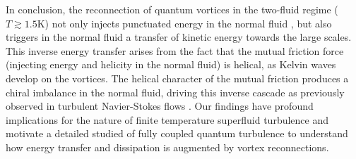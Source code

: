 \documentclass[%
 reprint,
 amsmath,amssymb,
 aps,
 prl,
]{revtex4-2}
\begin{document}
In conclusion, the reconnection of quantum vortices in the two-fluid regime
($T\gtrsim 1.5$K) not only injects punctuated
energy in the normal fluid \cite{stasiak2024quantum}, but also triggers in the normal fluid
a transfer of kinetic energy towards the large scales. This inverse 
energy transfer arises from the fact that the mutual friction force (injecting energy and 
helicity in the normal fluid) is helical, as Kelvin waves develop on the vortices.
The helical character of the mutual friction produces a chiral imbalance in the normal fluid, driving this inverse cascade as previously observed in turbulent Navier-Stokes flows
\cite{biferaleInverseEnergyCascade2012a,plunianInverseCascadeEnergy2020a}.
Our findings have profound implications for the nature of finite temperature superfluid turbulence and motivate a detailed studied of fully coupled quantum turbulence to understand how energy transfer and dissipation is augmented by vortex reconnections.

\end{document}
